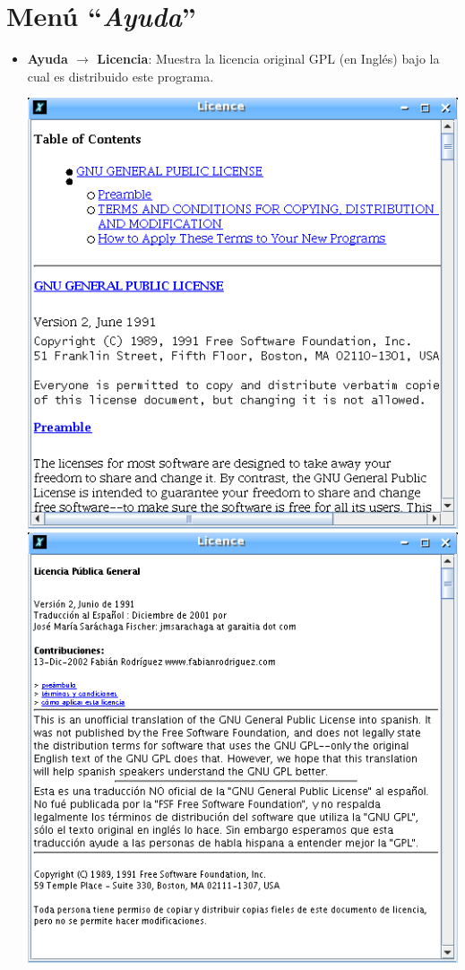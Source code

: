 \section{Men\'u ``\textit{Ayuda}''}
   \label{Menu-Ayuda}

\begin{itemize}
   \item \textbf{Ayuda $\rightarrow$ Licencia}: Muestra
      la licencia original GPL (en Ingl\'es) bajo la cual es distribuido este
      programa.
      \begin{center}
         \includegraphics[scale=0.3]{Imagenes/03_Opciones-Menu/Licencia.png}
         \hfill
         \includegraphics[scale=0.3]{Imagenes/03_Opciones-Menu/Licencia-sp.png}

\end{center}
\end{itemize}
